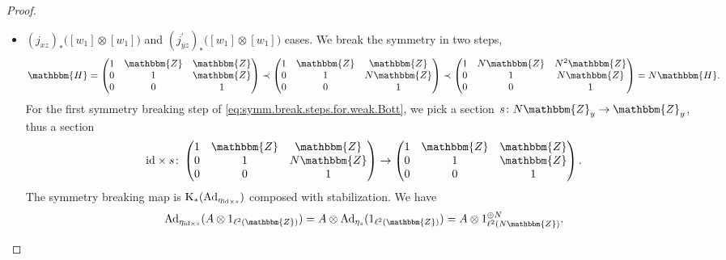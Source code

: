 \documentclass{amsart}
\numberwithin{figure}{section}
\numberwithin{equation}{section}
\numberwithin{table}{section}
\theoremstyle{plain}
\theoremstyle{definition}
\theoremstyle{remark}
\theoremstyle{nonumber}
\newcommand{\Z}{\mathbb{Z}}
\newcommand{\HH}{\mathbb{H}} %
\newcommand{\K}{\relax\ifmmode\operatorname{K}\else\textup{K}\fi}
\newcommand{\Cst}{\relax\ifmmode\mathrm{C}^*\else\textup{C*}\fi}
\newcommand{\Cstr}{\Cst_\rho} %
\newcommand{\Ad}{\operatorname{Ad}} %
\renewcommand{\mathbb}{\mathbbm} %
\begin{document}
\begin{proof}
\begin{itemize}
Unlike formula \eqref{eq:tensor.form.U} for $U_1$, under the Hilbert space isomorphism \eqref{eq:Heis.Hilbert.decomposition}, the unitary $V_1$ does not have a simple tensor decomposition formula. Instead, let us consider the map
\begin{equation}\label{eq:Heis.real.auto}
\varsigma_1\colon \HH\to\HH,\qquad (x,y,z)\mapsto (y,x,xy-z),
\end{equation}
which is an automorphism squaring to the identity. Restricting $\varsigma_1$ to $N\HH$, we also have an automorphism
\[
\varsigma_N\colon  N\HH\to N\HH.
\]
We denote the induced $\Cst$-algebra automorphisms of $\Cstr(\HH)$ and $\Cstr(N\HH)$ with the same symbols $\varsigma_1$ and $\varsigma_N$ respectively. We have $\varsigma_1(U_1)=V_1$ and $\varsigma_N(U_N)=V_N$. Moreover, the automorphisms are compatible with symmetry breaking,
\begin{align*}
\phi_{N\HH\backslash \HH}[V_1]&=\phi_{N\HH\backslash \HH}\circ (\varsigma_1)_*[U_1]\\
&=(\varsigma_N)_*\circ\phi_{N\HH\backslash \HH}[U_1]\\
&=(\varsigma_N)_*\big(N^3[U_N]\big)=N^3[V_N].
\end{align*}



\item {} $(j_{xz})_*\big([w_{1}]\otimes [w_{1}]\big)$ and $(j_{yz}^\prime)_*\big([w_{1}]\otimes [w_{1}]\big)$ cases. We break the symmetry in two steps,
\begin{equation}\label{eq:symm.break.steps.for.weak.Bott}
\HH=\begin{pmatrix}1 & \Z & \Z \\ 0 & 1 & \Z\\ 0 & 0 & 1\end{pmatrix}\prec \begin{pmatrix} 1 & \Z & \Z \\ 0 & 1 & N\Z\\ 0 & 0 & 1 \end{pmatrix} \prec \begin{pmatrix} 1 & N\Z & N^2\Z \\ 0 & 1 & N\Z\\ 0 & 0 & 1 \end{pmatrix}=N\HH.
\end{equation}
For the first symmetry breaking step of
\eqref{eq:symm.break.steps.for.weak.Bott}, we pick a section $s\colon N\Z_y\to \Z_y$, thus a section
\[
{\rm id}\times s\colon  \begin{pmatrix} 1 & \Z & \Z \\ 0 & 1 & N\Z\\ 0 & 0 & 1 \end{pmatrix} \to \begin{pmatrix} 1 & \Z & \Z \\ 0 & 1 & \Z\\ 0 & 0 & 1 \end{pmatrix}.
\]
The symmetry breaking map is $\K_*(\Ad_{\eta_{{\rm id}\times s}})$ composed with stabilization. We have
\[
\Ad_{\eta_{{\rm id}\times s}}(A\otimes 1_{\ell^2(\Z)})=A\otimes {\rm Ad}_{\eta_s}(1_{\ell^2(\Z)})=A\otimes 1_{\ell^2(N\Z)}^{\oplus N}.
\]


\end{itemize}
\end{proof}
\end{document}
